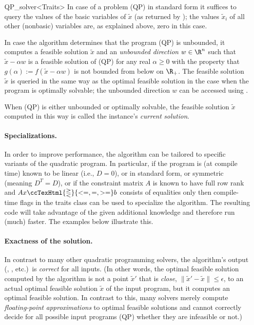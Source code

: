 \begin{ccRefClass}{QP_solver<Traits>}
In case of a problem (QP) in standard form it suffices to query the
values of the basic variables of $\tilde{x}$ (as returned by
); the values
$\tilde{x}_i$ of all other (nonbasic) variables are, as explained
above, zero in this case.

In case the algorithm determines that the program (QP) is unbounded,
it computes a feasible solution $\tilde{x}$ and an \emph{unbounded
direction} $w\in\R^n$ such that $\tilde{x}-\alpha w$ is a feasible
solution of (QP) for any real $\alpha\geq 0$ with the property that
$g(\alpha):= f(\tilde{x}-\alpha w)$ is not bounded from below on
$\R_+$.  The feasible solution $\tilde{x}$ is queried in the same way
as the optimal feasible solution in the case when the program is
optimally solvable; the unbounded direction $w$ can be accessed using
.

When (QP) is either unbounded or optimally solvable, the feasible
solution $\tilde{x}$ computed in this way is called the instance's
\emph{current solution}.

\paragraph{Specializations.}
In order to improve performance, the algorithm can be tailored to
specific variants of the quadratic program.  In particular, if the
program is (at compile time) known to be linear (i.e., $D=0$), or in
standard form, or symmetric (meaning $D^{T}=D$), or if the constraint
matrix $A$ is known to have full row rank and $Ax \ccTexHtml{\gtreqless}{<=,=,>=} b$
consists of equalities only then compile-time flags in the traits
class  can be used to specialize the algorithm.  The
resulting code will take advantage of the given additional knowledge
and therefore run (much) faster. The examples below illustrate this.

\paragraph{Exactness of the solution.}
In contrast to many other quadratic programming solvers, the
algorithm's output (, , etc.)\ is
\emph{correct} for all inputs.  (In other words, the optimal feasible
solution computed by the algorithm is not a point $\tilde{x}'$ that is
\emph{close}, $\|\tilde{x}'-\tilde{x}\|\le \epsilon$, to an actual
optimal feasible solution $\tilde{x}$ of the input program, but it
computes an optimal feasible solution.  In contrast to this, many
solvers merely compute \emph{floating-point approximations} to optimal
feasible solutions and cannot correctly decide for all possible input
programs (QP) whether they are infeasible or not.)


\end{ccRefClass}
